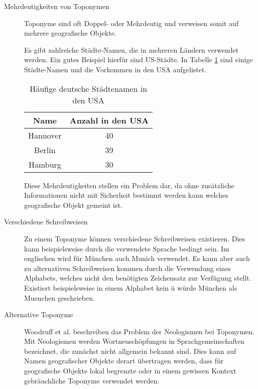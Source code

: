 			\begin{description}

				\item[Mehrdeutigkeiten von Toponymen]

					Toponyme sind oft Doppel- oder Mehrdeutig und verweisen somit auf mehrere geografische Objekte.
				
					Es gibt zahlreiche Städte-Namen, die in mehreren Ländern verwendet werden.
					Ein gutes Beispiel hierfür sind US-Städte. 
					In Tabelle \ref{tab:usCitiesGermanNames} sind einige Städte-Namen und die Vorkommen in den USA aufgelistet.
					
					\begin{table}[htpb]
						\caption{Häufige deutsche Städtenamen in den USA} 
						\centering
						\begin{tabular}{|c|c|}
							\hline
							Name & Anzahl in den USA \\
							\hline\hline
							Hannover & 40 \\
							\hline
							Berlin & 39 \\
							\hline
							Hamburg & 30 \\
							\hline
						\end{tabular}
						\label{tab:usCitiesGermanNames} 
					\end{table}

					Diese Mehrdeutigkeiten stellen ein Problem dar, da ohne zusätzliche Informationen nicht mit Sicherheit bestimmt werden kann welches geografische Objekt gemeint ist.
					
				\item [Verschiedene Schreibweisen]

					Zu einem Toponyme können verschiedene Schreibweisen existieren. 
					Dies kann beispielsweise durch die verwendete Sprache bedingt sein.
					Im englischen wird für München auch Munich verwendet.
					Es kann aber auch zu alternativen Schreibweisen kommen durch die Verwendung eines Alphabets, welches nicht den benötigten Zeichensatz zur Verfügung stellt.
					Existiert beispielsweise in einem Alphabet kein ü würde München als Muenchen geschrieben.  

			  	\item [Alternative Toponyme]

			  		Woodruff et al. beschreiben das Problem der Neologismen bei Toponymen. 
			  		Mit Neologismen werden Wortneuschöpfungen in Sprachgemeinschaften bezeichnet, die zunächst nicht allgemein bekannt sind. 
			  		Dies kann auf Namen geografischer Objekte derart übertragen werden, dass für geografische Objekte lokal begrenzte oder in einem gewissen Kontext gebräuchliche Toponyme verwendet werden.


\end{description}
